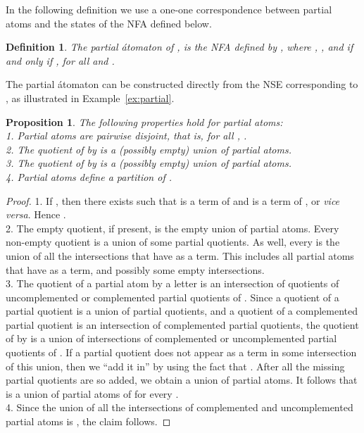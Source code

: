 \documentclass[preprint,12pt]{elsarticle}
\newtheorem{proposition}{Proposition}
\newtheorem{definition}{Definition}
\begin{document}
In the following definition we use a one-one correspondence 
 between partial atoms  and the states 
 of the NFA  defined below.

\begin{definition}
\label{def:partial_atomaton}
The \emph{partial \'atomaton} of  , is the NFA defined by 
,
 where ,
 , 
 and  if and only if 
, 
for all  and .
\end{definition}


The partial \'atomaton can be constructed directly from the NSE corresponding to , as illustrated in Example~\ref{ex:partial}.


\begin{proposition}
\label{prop:quotient_partial}
The following properties hold for partial atoms:\\
1. Partial atoms are pairwise disjoint, that is,  for all 
, .\\
2. The quotient  of  by  is a (possibly empty) union of 
partial atoms.\\
3. The quotient  of  by  is 
a (possibly empty) union of partial atoms.\\
4. Partial atoms define a partition of .
\end{proposition}
\begin{proof}
1. If , then there exists  such that 
 is a term of  and  is a term of , or \emph{vice versa}. 
Hence .\\
2. The empty quotient, if present, is the empty union of partial atoms. 
Every non-empty quotient  is a union of some partial quotients. 
As well, every  is the union of all the  
intersections that have  as a term. 
This includes all partial atoms that have  as a term, and possibly 
some empty intersections.\\
3. The quotient of a partial atom  by a letter  is an intersection 
of quotients of uncomplemented or complemented partial quotients of . 
Since a quotient of a partial quotient is a union of partial quotients, 
and a quotient of a complemented partial quotient is an intersection of complemented 
partial quotients, the quotient of  by  is a union of intersections of
complemented or uncomplemented partial quotients of .
If a partial quotient  does not appear as a term in some intersection  
of this union, then we ``add it in'' by using the fact that 
.
After all the missing partial quotients are so added, we obtain a union of 
partial atoms.
It  follows that  is a union of partial atoms of  for every .\\
4. Since the union of all the intersections of complemented and uncomplemented partial atoms is , the claim follows.
\end{proof}
\end{document}
